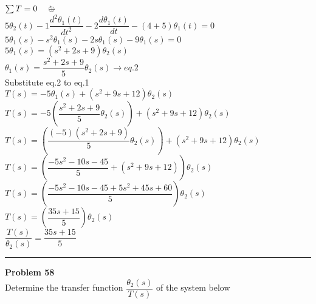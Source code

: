 \documentclass[11pt,letterpaper]{article}
\begin{document}
\begin{center}
					$\sum T = 0 \quad \circlearrowright \hspace{-0.8em} $+$  $ \\
	
					$5\theta_2(t)-1\dfrac{d^2\theta_1(t)}{dt^2}-2\dfrac{d\theta_1(t)}{dt}-(4+5)\theta_1(t)=0$\\
	
					$5\theta_1(s)-s^2\theta_1(s)-2s\theta_1(s)-9\theta_1(s)=0$\\
	
					$5\theta_1(s)=(s^2+2s+9)\theta_2(s)$\\
	
					$\theta_1(s)=\dfrac{s^2+2s+9}{5}\theta_2(s)  \rightarrow eq.2$\\

					Substitute eq.2 to eq.1\\

					$T(s)=-5\theta_1(s)+(s^2+9s+12)\theta_2(s)$\\

					$T(s)=-5\left(\dfrac{s^2+2s+9}{5}\theta_2(s)\right)+(s^2+9s+12)\theta_2(s)$\\

					$T(s)=\left(\dfrac{(-5)(s^2+2s+9)}{5}\theta_2(s)\right)+(s^2+9s+12)\theta_2(s)$\\

					$T(s)=\left(\dfrac{-5s^2-10s-45}{5}+(s^2+9s+12)\right)\theta_2(s)$\\

					$T(s)=\left(\dfrac{-5s^2-10s-45+5s^2+45s+60}{5}\right)\theta_2(s)$\\

					$T(s)=\left(\dfrac{35s+15}{5}\right)\theta_2(s)$\\

					$\dfrac{T(s)}{\theta_2(s)}=\dfrac{35s+15}{5}$\\

					

\end{center}					
\clearpage
\rule{\textwidth}{1pt}
\textbf{Problem 58}\\
Determine the transfer function $\dfrac{\theta_2(s)}{T(s)}$ of the system below\\
\end{document}
